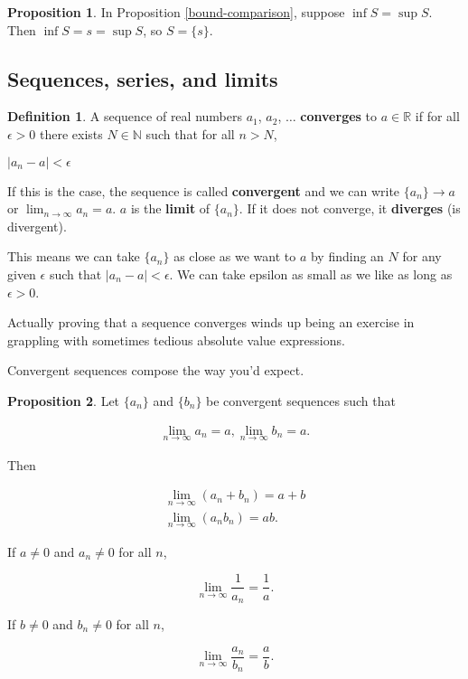 \documentclass{article}
\theoremstyle{definition}
\newtheorem{definition}{Definition}[section]
\newtheorem{proposition}{Proposition}[section]
\begin{document}
\begin{proposition}
In Proposition \ref{bound-comparison}, suppose $\inf S = \sup S$. Then $\inf S = s = \sup S$, so $S = \{s\}$.
\end{proposition}

\subsection{Sequences, series, and limits}

\begin{definition} 
A sequence of real numbers $a_1$, $a_2$, $\ldots$ \textbf{converges} to $a \in \mathbb{R}$ if for all $\epsilon > 0$ there exists $N \in \mathbb{N}$ such that for all $n > N$,

\begin{center}
$|a_n - a| < \epsilon$
\end{center}

If this is the case, the sequence is called \textbf{convergent} and we can write $\{a_n\} \to a$ or $\lim_{n \to \infty} a_n = a$. $a$ is the \textbf{limit} of $\{a_n\}$. If it does not converge, it \textbf{diverges} (is divergent).
\end{definition}

This means we can take $\{a_n\}$ as close as we want to $a$ by finding an $N$ for any given $\epsilon$ such that $|a_n - a| < \epsilon$. We can take epsilon as small as we like as long as $\epsilon > 0$.

Actually proving that a sequence converges winds up being an exercise in grappling with sometimes tedious
absolute value expressions.

Convergent sequences compose the way you'd expect.

\pagebreak

\begin{proposition}
Let $\{a_n\}$ and $\{b_n\}$ be convergent sequences such that

\begin{align}
\lim_{n \to \infty} a_n = a, \lim_{n \to \infty} b_n = a.
\end{align}

Then

\begin{align}
\lim_{n \to \infty} (a_n + b_n) = a + b \\
\lim_{n \to \infty} (a_n b_n) = ab.
\end{align}

If $a \neq 0$ and $a_n \neq 0$ for all $n$,

\begin{equation}
\lim_{n \to \infty} \frac{1}{a_n} = \frac{1}{a}.
\end{equation}

If $b \neq 0$ and $b_n \neq 0$ for all $n$,

\begin{equation}
\lim_{n \to \infty} \frac{a_n}{b_n} = \frac{a}{b}.
\end{equation}

\end{proposition}
\end{document}

